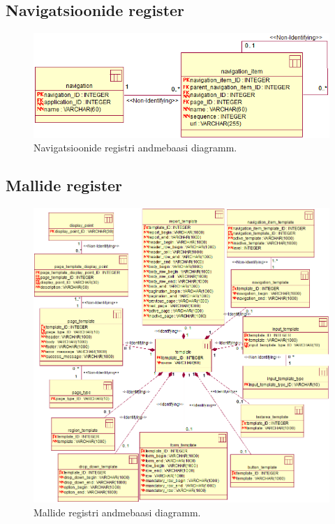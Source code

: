 \documentclass[a4paper,12pt]{article} %
\begin{document}
\subsection*{Navigatsioonide register}
\begin{figure}[H]
\centering
\includegraphics[width=\textwidth]{./diagrams/navigation-db-diagram.png}
\caption{Navigatsioonide registri andmebaasi diagramm.}
\label{fig_navigatsioonide_registri_andmebaasi_diagramm}
\end{figure}

\subsection*{Mallide register}
\begin{figure}[H]
\centering
\includegraphics[width=\textwidth]{./diagrams/template-db-diagram.png}
\caption{Mallide registri andmebaasi diagramm.}
\label{fig_mallide_registri_andmebaasi_diagramm}
\end{figure}
\end{document}

